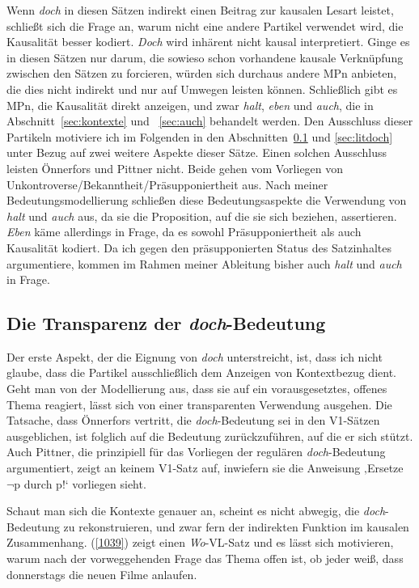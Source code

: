 Wenn \textit{doch} in diesen Sätzen indirekt einen Beitrag zur kausalen Lesart leistet, schließt sich die Frage an, warum nicht eine andere Partikel verwendet wird, die Kausalität besser kodiert. \textit{Doch} wird inhärent nicht kausal interpretiert. Ginge es in diesen Sätzen nur darum, die sowieso schon vorhandene kausale Verknüpfung zwischen den Sätzen zu forcieren, würden sich durchaus andere MPn anbieten, die dies nicht indirekt und nur auf Umwegen leisten können. Schließlich gibt es MPn, die Kausalität direkt anzeigen, und zwar \textit{halt}, \textit{eben} und \textit{auch}, die in Abschnitt~\ref{sec:kontexte} und ~\ref{sec:auch} behandelt werden. Den Ausschluss dieser Partikeln motiviere ich im Folgenden in den Abschnitten~\ref{sec:transdoch} und \ref{sec:litdoch} unter Bezug auf zwei weitere Aspekte dieser Sätze. Einen solchen Ausschluss leisten Önnerfors und Pittner nicht. Beide gehen vom Vorliegen von Unkontroverse\slash Bekanntheit\slash Präsupponiertheit aus. Nach meiner Bedeutungsmodellierung schließen diese Bedeutungsaspekte die Verwendung von \textit{halt} und \textit{auch} aus, da sie die Proposition, auf die sie sich beziehen, assertieren. \textit{Eben} käme allerdings in Frage, da es sowohl Präsupponiertheit als auch Kausalität kodiert. Da ich gegen den präsupponierten Status des Satzinhaltes argumentiere, kommen im Rahmen meiner Ableitung bisher auch \textit{halt} und \textit{auch} in Frage.

\subsection{Die Transparenz der \textit{doch}-Bedeutung}
\label{sec:transdoch}\largerpage
Der erste Aspekt, der die Eignung von \textit{doch} unterstreicht, ist, dass ich nicht glaube, dass die Partikel ausschließlich dem Anzeigen von Kontextbezug dient. Geht man von der Modellierung aus, dass sie auf ein vorausgesetztes, offenes Thema reagiert, lässt sich von einer transparenten Verwendung ausgehen. Die Tatsache, dass Önnerfors vertritt, die \textit{doch}-Bedeutung sei in den V1-Sätzen ausgeblichen, ist folglich auf die Bedeutung zurückzuführen, auf die er sich stützt. Auch Pittner, die prinzipiell für das Vorliegen der regulären \textit{doch}-Bedeutung argumentiert, zeigt an keinem V1-Satz auf, inwiefern sie die Anweisung ‚Ersetze $\neg$p durch p!‘ vorliegen sieht.

Schaut man sich die Kontexte genauer an, scheint es nicht abwegig, die \textit{doch}-Bedeutung zu rekonstruieren, und zwar fern der indirekten Funktion im kausalen Zusammenhang. (\ref{1039}) zeigt einen \textit{Wo}-VL-Satz und es lässt sich motivieren, warum nach der vorweggehenden Frage das Thema offen ist, ob jeder weiß, dass donnerstags die neuen Filme anlaufen.

